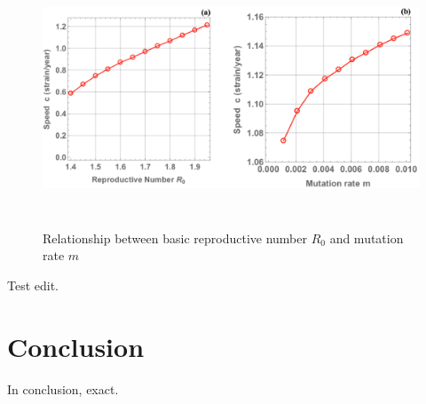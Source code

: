 \documentclass[preprint,12pt]{elsarticle}
\begin{document}
\begin{figure}
  \centering
  \includegraphics[width=6in,height=3in]{figures/SpeedRM}
  \caption{Relationship between basic reproductive number \(R_0\) and mutation rate \(m\)}
  \label{fig:SpeedRM}
\end{figure}

Test edit.


\section{Conclusion}
In conclusion, exact.














\end{document}
